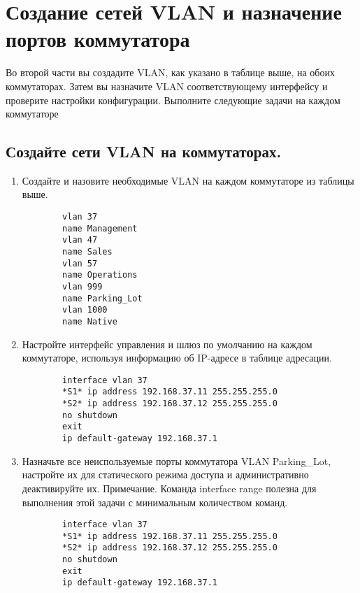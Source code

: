 \section{Создание сетей VLAN и назначение портов коммутатора}
Во второй части вы создадите VLAN, как указано в таблице выше, на обоих коммутаторах.
Затем вы назначите VLAN соответствующему интерфейсу и проверите настройки конфигурации.
Выполните следующие задачи на каждом коммутаторе

\subsection{Создайте сети VLAN на коммутаторах.}
\begin{enumerate}[a]
    \item Создайте и назовите необходимые VLAN на каждом коммутаторе из таблицы выше.
    \begin{verbatim}
        vlan 37
        name Management
        vlan 47
        name Sales
        vlan 57
        name Operations
        vlan 999
        name Parking_Lot
        vlan 1000
        name Native
    \end{verbatim}

    \item Настройте интерфейс управления и шлюз по умолчанию на каждом коммутаторе, используя
    информацию об IP-адресе в таблице адресации.
    \begin{verbatim}
        interface vlan 37
        *S1* ip address 192.168.37.11 255.255.255.0
        *S2* ip address 192.168.37.12 255.255.255.0
        no shutdown
        exit
        ip default-gateway 192.168.37.1
    \end{verbatim}

    \item Назначьте все неиспользуемые порты коммутатора VLAN Parking\_Lot, настройте их для
    статического режима доступа и административно деактивируйте их.
    Примечание.
    Команда interface range полезна для выполнения этой задачи с минимальным
    количеством команд.
    \begin{verbatim}
        interface vlan 37
        *S1* ip address 192.168.37.11 255.255.255.0
        *S2* ip address 192.168.37.12 255.255.255.0
        no shutdown
        exit
        ip default-gateway 192.168.37.1
    \end{verbatim}
\end{enumerate}


